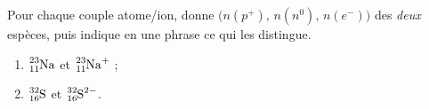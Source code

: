 \documentclass[11pt,a4paper]{article}
\begin{document}
\begin{exo}
Pour chaque couple atome/ion, donne $\big(n(p^+),\,n(n^0),\,n(e^-)\big)$ des \emph{deux} espèces, puis
indique en une phrase ce qui les distingue.
\begin{enumerate}[label=\alph*)]
  \item $\ce{^{23}_{11}Na}$ et $\ce{^{23}_{11}Na^{+}}$ ;
  \item $\ce{^{32}_{16}S}$ et $\ce{^{32}_{16}S^{2-}}$.
\end{enumerate}
\end{exo}
\end{document}
